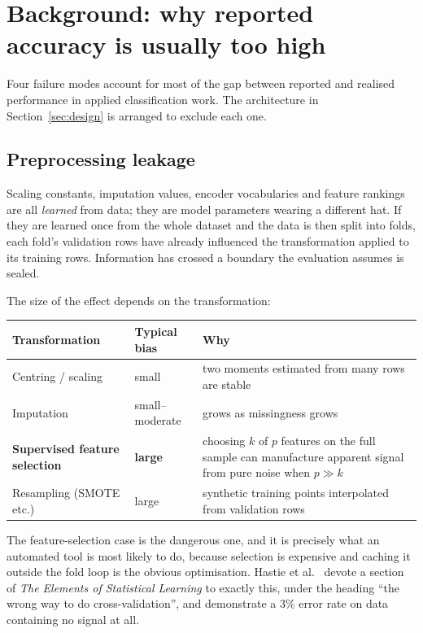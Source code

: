 \documentclass[11pt,a4paper]{article}
\begin{document}
\section{Background: why reported accuracy is usually too high}

Four failure modes account for most of the gap between reported and realised
performance in applied classification work. The architecture in
Section~\ref{sec:design} is arranged to exclude each one.

\subsection{Preprocessing leakage}
\label{sec:leakage}

Scaling constants, imputation values, encoder vocabularies and feature rankings
are all \emph{learned} from data; they are model parameters wearing a different
hat. If they are learned once from the whole dataset and the data is then split
into folds, each fold's validation rows have already influenced the
transformation applied to its training rows. Information has crossed a boundary
the evaluation assumes is sealed.

The size of the effect depends on the transformation:

\begin{center}
\begin{tabularx}{\textwidth}{L{4.4cm} L{2.6cm} X}
\toprule
\textbf{Transformation} & \textbf{Typical bias} & \textbf{Why} \\
\midrule
Centring / scaling & small & two moments estimated from many rows are stable \\
Imputation & small--moderate & grows as missingness grows \\
\textbf{Supervised feature selection} & \textcolor{warn}{\textbf{large}} & choosing $k$ of $p$ features on the full sample can manufacture apparent signal from pure noise when $p \gg k$ \\
Resampling (SMOTE etc.) & \textcolor{warn}{large} & synthetic training points interpolated from validation rows \\
\bottomrule
\end{tabularx}
\end{center}

The feature-selection case is the dangerous one, and it is precisely what an
automated tool is most likely to do, because selection is expensive and caching
it outside the fold loop is the obvious optimisation. Hastie et
al.~\cite{esl} devote a section of \emph{The Elements of Statistical Learning}
to exactly this, under the heading ``the wrong way to do cross-validation'',
and demonstrate a $3\%$ error rate on data containing no signal at all.
\end{document}
